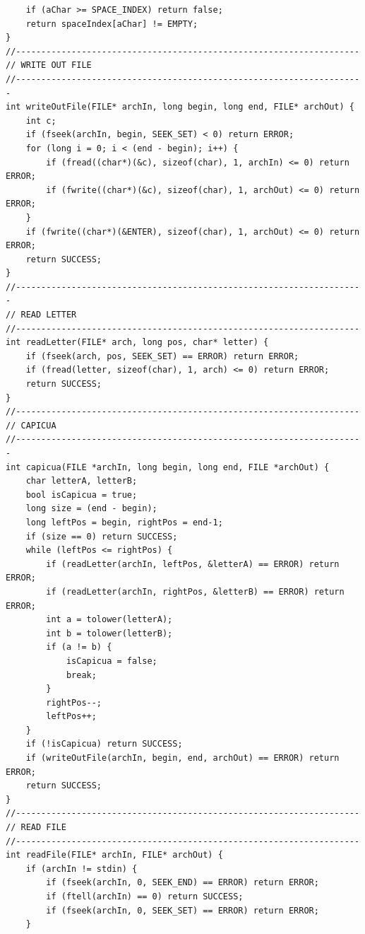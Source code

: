 \documentclass[a4paper,10pt]{article}
\begin{document}
\begin{lstlisting}
    if (aChar >= SPACE_INDEX) return false;
    return spaceIndex[aChar] != EMPTY;
}
//--------------------------------------------------------------------
// WRITE OUT FILE
//---------------------------------------------------------------------
int writeOutFile(FILE* archIn, long begin, long end, FILE* archOut) {
    int c;
    if (fseek(archIn, begin, SEEK_SET) < 0) return ERROR;
    for (long i = 0; i < (end - begin); i++) {
        if (fread((char*)(&c), sizeof(char), 1, archIn) <= 0) return ERROR;
        if (fwrite((char*)(&c), sizeof(char), 1, archOut) <= 0) return ERROR;
    }
    if (fwrite((char*)(&ENTER), sizeof(char), 1, archOut) <= 0) return ERROR;
    return SUCCESS;
}
//---------------------------------------------------------------------
// READ LETTER
//--------------------------------------------------------------------
int readLetter(FILE* arch, long pos, char* letter) {
    if (fseek(arch, pos, SEEK_SET) == ERROR) return ERROR;
    if (fread(letter, sizeof(char), 1, arch) <= 0) return ERROR;
    return SUCCESS;
}
//--------------------------------------------------------------------
// CAPICUA
//---------------------------------------------------------------------
int capicua(FILE *archIn, long begin, long end, FILE *archOut) {
    char letterA, letterB;
    bool isCapicua = true;
    long size = (end - begin);
    long leftPos = begin, rightPos = end-1;
    if (size == 0) return SUCCESS;
    while (leftPos <= rightPos) {
        if (readLetter(archIn, leftPos, &letterA) == ERROR) return ERROR;
        if (readLetter(archIn, rightPos, &letterB) == ERROR) return ERROR;
        int a = tolower(letterA);
        int b = tolower(letterB);
        if (a != b) {
            isCapicua = false;
            break;
        }
        rightPos--;
        leftPos++;
    }
    if (!isCapicua) return SUCCESS;
    if (writeOutFile(archIn, begin, end, archOut) == ERROR) return ERROR;
    return SUCCESS;
}
//--------------------------------------------------------------------
// READ FILE
//--------------------------------------------------------------------
int readFile(FILE* archIn, FILE* archOut) {
    if (archIn != stdin) {
        if (fseek(archIn, 0, SEEK_END) == ERROR) return ERROR;
        if (ftell(archIn) == 0) return SUCCESS;
        if (fseek(archIn, 0, SEEK_SET) == ERROR) return ERROR;
    }


\end{lstlisting}
\end{document}
